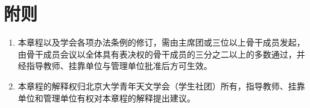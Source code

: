 \section{附则}

\begin{enumerate}[resume]
    \item 本章程以及学会各项办法条例的修订，需由主席团或三位以上骨干成员发起，由骨干成员会议以全体具有表决权的骨干成员的三分之二以上的多数通过，并经指导教师、挂靠单位与管理单位批准后方可生效。
    
    \item 本章程的解释权归北京大学青年天文学会（学生社团）所有，指导教师、挂靠单位和管理单位有权对本章程的解释提出建议。
\end{enumerate}